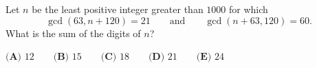 Let $n$ be the least positive integer greater than $1000$ for which
\[\gcd(63,n+120)=21\qquad\text{and}\qquad\gcd(n+63,120)=60.\]
What is the sum of the digits of $n$?

$\textbf{(A) }12\qquad\textbf{(B) }15\qquad\textbf{(C) }18\qquad\textbf{(D) }21\qquad\textbf{(E) }24$
